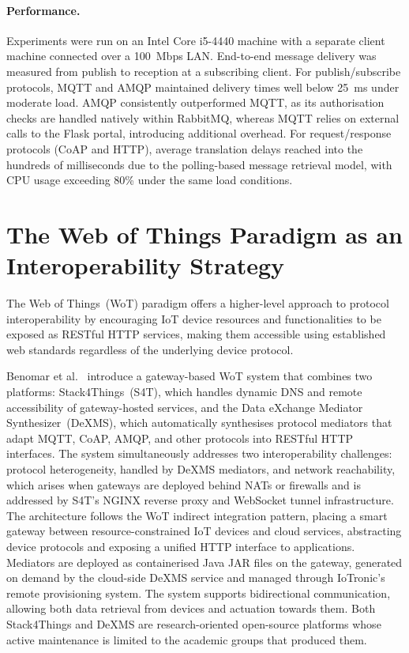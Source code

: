 \paragraph{Performance.}
Experiments were run on an Intel Core i5-4440 machine with a separate client machine connected over a 100~Mbps LAN. End-to-end message delivery was measured from publish to reception at a subscribing client. For publish/subscribe protocols, MQTT and AMQP maintained delivery times well below 25~ms under moderate load. AMQP consistently outperformed MQTT, as its authorisation checks are handled natively within RabbitMQ, whereas MQTT relies on external calls to the Flask portal, introducing additional overhead. For request/response protocols (CoAP and HTTP), average translation delays reached into the hundreds of milliseconds due to the polling-based message retrieval model, with CPU usage exceeding 80\% under the same load conditions.

\section{The Web of Things Paradigm as an Interoperability Strategy}
\label{sec:soa_wot}

The Web of Things~(WoT) paradigm offers a higher-level approach to protocol interoperability by encouraging IoT device resources and functionalities to be exposed as RESTful HTTP services, making them accessible using established web standards regardless of the underlying device protocol.

Benomar et al.~\cite{benomar2024} introduce a gateway-based WoT system that combines two platforms: Stack4Things~(S4T), which handles dynamic DNS and remote accessibility of gateway-hosted services, and the Data eXchange Mediator Synthesizer~(DeXMS), which automatically synthesises protocol mediators that adapt MQTT, CoAP, AMQP, and other protocols into RESTful HTTP interfaces. The system simultaneously addresses two interoperability challenges: protocol heterogeneity, handled by DeXMS mediators, and network reachability, which arises when gateways are deployed behind NATs or firewalls and is addressed by S4T's NGINX reverse proxy and WebSocket tunnel infrastructure. The architecture follows the WoT indirect integration pattern, placing a smart gateway between resource-constrained IoT devices and cloud services, abstracting device protocols and exposing a unified HTTP interface to applications. Mediators are deployed as containerised Java JAR files on the gateway, generated on demand by the cloud-side DeXMS service and managed through IoTronic's remote provisioning system. The system supports bidirectional communication, allowing both data retrieval from devices and actuation towards them. Both Stack4Things and DeXMS are research-oriented open-source platforms whose active maintenance is limited to the academic groups that produced them.

